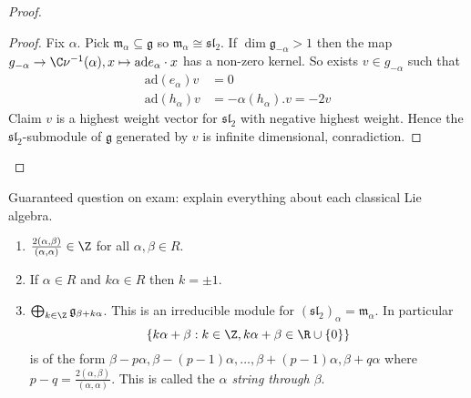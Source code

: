 \documentclass[a4paper]{article}
\newcommand*{\Lie}[1]{\mathfrak{#1}} %
\newcommand{\ad}{\mathrm{ad}} %
\begin{document}
\begin{proof}
  \begin{proof}
    Fix \(\alpha\). Pick \(\Lie m_\alpha \subseteq \Lie g\) so \(\Lie m_\alpha \cong \Lie{sl}_2\). If \(\dim \Lie g_{-\alpha} > 1\) then the map \(g_{-\alpha} \to \C \nu^{-1}(\alpha), x \mapsto \ad e_\alpha \cdot x\) has a non-zero kernel. So exists \(v \in g_{-\alpha}\) such that
    \begin{align*}
      \ad(e_\alpha) v &= 0 \\
      \ad(h_\alpha) v &= -\alpha(h_\alpha) . v = -2v
    \end{align*}
    Claim \(v\) is a highest weight vector for \(\Lie{sl}_2\) with negative highest weight. Hence the \(\Lie{sl}_2\)-submodule of \(\Lie g\) generated by \(v\) is infinite dimensional, conradiction.
  \end{proof}
\end{proof}

Guaranteed question on exam: explain everything about each classical Lie algebra.

\begin{theorem}\leavevmode
  \begin{enumerate}
  \item \(\frac{2(\alpha, \beta)}{(\alpha, \alpha)} \in \Z\) for all \(\alpha, \beta \in R\).
  \item If \(\alpha \in R\) and \(k \alpha \in R\) then \(k = \pm 1\).
  \item \(\bigoplus_{k \in \Z} \Lie g_{\beta + k \alpha}\). This is an irreducible module for \((\Lie{sl}_2)_\alpha = \Lie m_\alpha\). In particular
    \[
      \{k\alpha + \beta: k \in \Z, k \alpha + \beta \in \R \cup \{0\}\}
    \]
    is of the form \(\beta - p \alpha, \beta - (p - 1) \alpha, \dots, \beta + (p - 1)\alpha, \beta + q \alpha\) where \(p - q = \frac{2(\alpha, \beta)}{(\alpha, \alpha)}\). This is called the \emph{\(\alpha\) string through \(\beta\)}.
  \end{enumerate}
\end{theorem}
\end{document}
